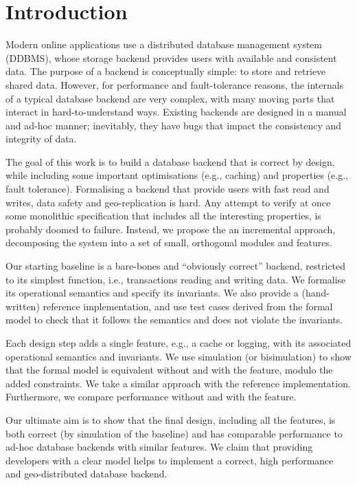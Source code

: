 \documentclass[systeme,french,english]{compas2022}
\begin{document}
\section{Introduction}

Modern online applications use a distributed database management system
(DDBMS), whose storage backend provides users with available and
consistent data.
The purpose of a backend is conceptually simple: to store and retrieve
shared data.
However, for performance and fault-tolerance reasons, the internals of a
typical database backend are very complex, with many moving parts that interact
in hard-to-understand ways.
Existing backends are designed in a manual and ad-hoc manner;
inevitably, they have bugs that impact the consistency and integrity of
data.

The goal of this work is to build a database backend that is correct by
design, while including some important optimisations (e.g., caching) and
properties (e.g., fault tolerance).
Formalising a backend that provide users with fast read and writes,
data safety and geo-replication is hard.
Any attempt to verify at once some monolithic specification that
includes all the interesting properties, is probably doomed to failure.
Instead, we propose the an incremental approach,  decomposing the
system into a set of small, orthogonal modules and features.

Our starting baseline is a bare-bones and ``obviously correct'' backend,
restricted to its simplest function, i.e., transactions reading and
writing data.
We formalise its operational semantics and specify its invariants.
We also provide a (hand-written) reference implementation, and use test
cases derived from the formal model to check that it follows the
semantics and does not violate the invariants.

Each design step adds a single feature, e.g., a cache or logging,
with its associated operational semantics and invariants.
We use simulation (or bisimulation) to show that the formal model is
equivalent without and with the feature, modulo the added constraints.
We take a similar approach with the reference implementation.
Furthermore, we compare performance without and with the feature.

Our ultimate aim is to show that the final design, including all the
features, is both correct (by simulation of the baseline) and has
comparable performance to ad-hoc database backends with similar features.
We claim that providing developers with a clear model helps to implement
a correct, high performance and geo-distributed database backend.
\end{document}

